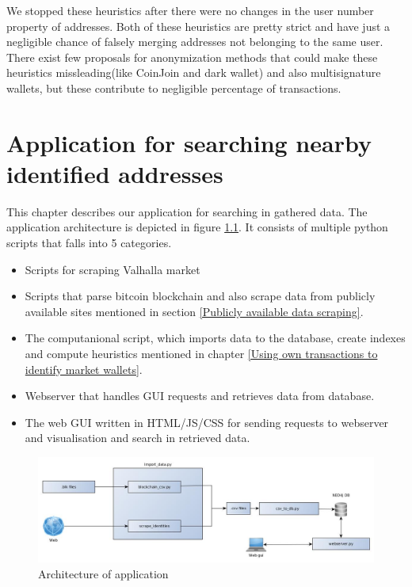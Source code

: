 \documentclass[
  digital, %
  table,   %
  lof,     %
  lot,     %
  oneside
]{fithesis3}
\begin{document}
We stopped these heuristics after there were no changes in the user number property of addresses.
Both of these heuristics are pretty strict and have just a negligible chance of falsely merging
addresses not belonging to the same user\parencite{androulaki2013evaluating}.
There exist few proposals for anonymization methods that could make
these heuristics missleading(like CoinJoin and dark wallet) and also
multisignature wallets, but these contribute to negligible percentage of transactions.

\chapter{Application for searching nearby identified addresses}

This chapter describes our application for searching in gathered data.
The application architecture is depicted in figure \ref{application_architecture}.
It consists of multiple python scripts that falls into 5 categories.

\begin{itemize}
 \item Scripts for scraping Valhalla market
 \item Scripts that parse bitcoin blockchain and also scrape data from publicly available sites mentioned in section \ref{Publicly available data scraping}.
 \item The computanional script, which imports data to the database, create indexes and compute heuristics mentioned in chapter \ref{Using own transactions to identify market wallets}.
 \item Webserver that handles GUI requests and retrieves data from database.
 \item The web GUI written in HTML/JS/CSS for sending requests to webserver and visualisation and search in retrieved data. 
\end{itemize}


\begin{figure}[!htb]
    \centering
    \includegraphics[width=1\textwidth]{application_architecture}
    \caption{Architecture of application}
    \label{application_architecture}
\end{figure}
\end{document}
